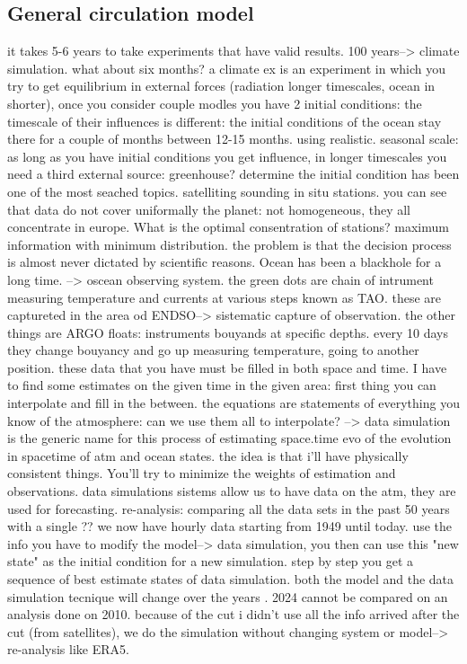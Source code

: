\subsection{General circulation model }
it takes 5-6 years to take experiments that have valid results. 100 years--> climate simulation. what about six months? a climate ex is an experiment in which you try to get equilibrium in external forces (radiation longer timescales, ocean in shorter), once you consider couple modles you have 2 initial conditions: the timescale of their influences is different: the initial conditions of the ocean stay there for a couple of months between 12-15 months. using realistic. seasonal scale: as long as you have initial conditions you get influence, in longer timescales you need a third external source: greenhouse? determine the initial condition has been one of the most seached topics. satelliting sounding in situ stations. you can see that data do not cover uniformally the planet: not homogeneous, they all concentrate in europe. What is the optimal consentration of stations? maximum information with minimum distribution. the problem is that the decision process is almost never dictated by scientific reasons. 
Ocean has been a blackhole for a long time. --> oscean observing system. the green dots are chain of intrument measuring temperature and currents at various steps known as TAO. these are captureted in the area od ENDSO--> sistematic capture of observation. the other things are ARGO floats: instruments bouyands at specific depths. every 10 days they change bouyancy and go up measuring temperature, going to another position. 
these data that you have must be filled in both space and time. I have to find some estimates on the given time in the given area: first thing you can interpolate and fill in the between. the equations are statements of everything you know of the atmosphere: can we use them all to interpolate? --> data simulation is the generic name for this process of estimating space.time evo of the evolution in spacetime of atm and ocean states. the idea is that i'll have physically consistent things. You'll try to minimize the weights of estimation and observations. data simulations sistems allow us to have data on the atm, they are used for forecasting.
re-analysis: comparing all the data sets in the past 50 years with a single ?? we now have hourly data starting from 1949 until today.  use the info you have to modify the model--> data simulation, you then can use this "new state" as the initial condition for a new simulation. step by step you get a sequence of best estimate states of data simulation. both the model and the data simulation tecnique will change over the years . 2024 cannot be compared on an analysis done on 2010. because of the cut i didn't use all the info arrived after the cut (from satellites), we do the simulation without changing system or model--> re-analysis like ERA5. 

